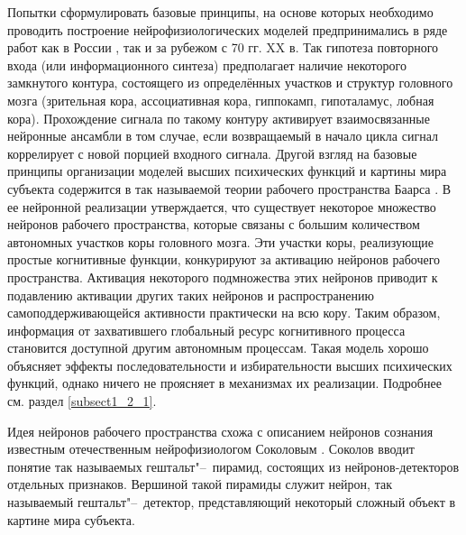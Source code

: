 Попытки сформулировать базовые принципы, на основе которых необходимо проводить построение нейрофизиологических моделей предпринимались в ряде работ как в России \cite{Ivanitsky1996,IvanitskyE1996}, так и за рубежом \cite{Edelmen1981} с 70 гг. XX в. Так гипотеза повторного входа (или информационного синтеза) предполагает наличие некоторого замкнутого контура, состоящего из определённых участков и структур головного мозга (зрительная кора, ассоциативная кора, гиппокамп, гипоталамус, лобная кора). Прохождение сигнала по такому контуру активирует взаимосвязанные нейронные ансамбли в том случае, если возвращаемый в начало цикла сигнал коррелирует с новой порцией входного сигнала. Другой взгляд на базовые принципы организации моделей высших психических функций и картины мира субъекта содержится в так называемой теории рабочего пространства Баарса \cite{Baars2005}. В ее нейронной реализации \cite{Dehaene2003} утверждается, что существует некоторое множество нейронов рабочего пространства, которые связаны с большим количеством автономных участков коры головного мозга. Эти участки коры, реализующие простые когнитивные функции, конкурируют за активацию нейронов рабочего пространства. Активация некоторого подмножества этих нейронов приводит к подавлению активации других таких нейронов и распространению самоподдерживающейся активности практически на всю кору. Таким образом, информация от захватившего глобальный ресурс когнитивного процесса становится доступной другим автономным процессам. Такая модель хорошо объясняет эффекты последовательности и избирательности высших психических функций, однако ничего не проясняет в механизмах их реализации. Подробнее см. раздел \ref{subsect1_2_1}.

Идея нейронов рабочего пространства схожа с описанием нейронов сознания известным отечественным нейрофизиологом Соколовым \cite{Sokolov2004}. Соколов вводит понятие так называемых гештальт"--~пирамид, состоящих из нейронов-детекторов отдельных признаков. Вершиной такой пирамиды служит нейрон, так называемый гештальт"--~детектор, представляющий некоторый сложный объект в картине мира субъекта.

